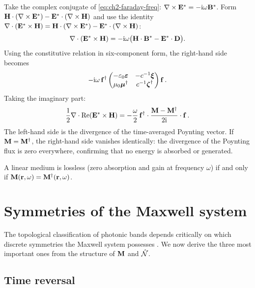 Take the complex conjugate of \eqref{eq:ch2-faraday-freq}:
$\nabla\times\mathbf{E}^*=-\mathrm{i}\omega\mathbf{B}^*$.  Form
$\mathbf{H}\cdot(\nabla\times\mathbf{E}^*)-\mathbf{E}^*\cdot(\nabla\times\mathbf{H})$
and use the identity
$\nabla\cdot(\mathbf{E}^*\times\mathbf{H})
=\mathbf{H}\cdot(\nabla\times\mathbf{E}^*)
-\mathbf{E}^*\cdot(\nabla\times\mathbf{H})$:
\begin{equation}\label{eq:ch2-complex-poynting}
  \nabla\cdot(\mathbf{E}^*\times\mathbf{H})
  = -\mathrm{i}\omega\bigl(
    \mathbf{H}\cdot\mathbf{B}^* - \mathbf{E}^*\cdot\mathbf{D}
  \bigr).
\end{equation}
Using the constitutive relation in six-component form, the right-hand
side becomes
\begin{equation}
  -\mathrm{i}\omega\,\mathbf{f}^\dagger
  \begin{pmatrix}
    -\varepsilon_0\boldsymbol{\varepsilon} & -c^{-1}\boldsymbol{\xi} \\
    \mu_0\boldsymbol{\mu}^\dagger & c^{-1}\boldsymbol{\zeta}^\dagger
  \end{pmatrix}
  \mathbf{f}\,.
\end{equation}
Taking the imaginary part:
\begin{equation}\label{eq:ch2-loss-condition}
  \frac{1}{2}\nabla\cdot\mathrm{Re}(\mathbf{E}^*\times\mathbf{H})
  = -\frac{\omega}{2}\,\mathbf{f}^\dagger\cdot
    \frac{\mathbf{M}-\mathbf{M}^\dagger}{2\mathrm{i}}\cdot\mathbf{f}\,.
\end{equation}
The left-hand side is the divergence of the time-averaged Poynting
vector.  If $\mathbf{M}=\mathbf{M}^\dagger$, the right-hand side vanishes
identically: the divergence of the Poynting flux is zero everywhere,
confirming that no energy is absorbed or generated.

\begin{proposition}
  \label{prop:ch2-lossless}
  A linear medium is lossless (zero absorption and gain at frequency
  $\omega$) if and only if $\mathbf{M}(\mathbf{r},\omega)=\mathbf{M}^\dagger(\mathbf{r},\omega)$.
\end{proposition}

\section{Symmetries of the Maxwell system}
\label{sec:ch2-symmetries}

The topological classification of photonic bands depends critically on
which discrete symmetries the Maxwell system possesses \cite{ozawa2018topological}.  We now derive
the three most important ones from the structure of $\mathbf{M}$ and
$\hat{\mathcal{N}}$.

\subsection{Time reversal}
\label{sec:ch2-time-reversal}

